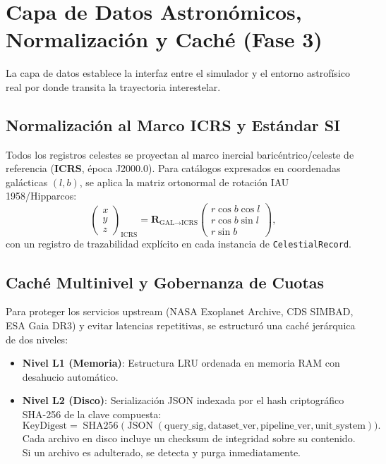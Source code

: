 \documentclass[11pt,a4paper]{article}
\begin{document}
\section{Capa de Datos Astronómicos, Normalización y Caché (Fase 3)}

La capa de datos establece la interfaz entre el simulador y el entorno astrofísico real por donde transita la trayectoria interestelar.

\subsection{Normalización al Marco ICRS y Estándar SI}
Todos los registros celestes se proyectan al marco inercial baricéntrico/celeste de referencia (\textbf{ICRS}, época J2000.0). Para catálogos expresados en coordenadas galácticas $(l, b)$, se aplica la matriz ortonormal de rotación IAU 1958/Hipparcos:
\begin{equation}
    \begin{pmatrix} x \\ y \\ z \end{pmatrix}_{\text{ICRS}} = \mathbf{R}_{\text{GAL}\to\text{ICRS}} \begin{pmatrix} r \cos b \cos l \\ r \cos b \sin l \\ r \sin b \end{pmatrix},
\end{equation}
con un registro de trazabilidad explícito en cada instancia de \texttt{CelestialRecord}.

\subsection{Caché Multinivel y Gobernanza de Cuotas}
Para proteger los servicios upstream (NASA Exoplanet Archive, CDS SIMBAD, ESA Gaia DR3) y evitar latencias repetitivas, se estructuró una caché jerárquica de dos niveles:
\begin{itemize}
    \item \textbf{Nivel L1 (Memoria)}: Estructura LRU ordenada en memoria RAM con desahucio automático.
    \item \textbf{Nivel L2 (Disco)}: Serialización JSON indexada por el hash criptográfico SHA-256 de la clave compuesta:
    \begin{equation}
        \text{KeyDigest} = \operatorname{SHA256}\Big(\operatorname{JSON}\left(\text{query\_sig}, \text{dataset\_ver}, \text{pipeline\_ver}, \text{unit\_system}\right)\Big).
    \end{equation}
    Cada archivo en disco incluye un checksum de integridad sobre su contenido. Si un archivo es adulterado, se detecta y purga inmediatamente.
\end{itemize}
\end{document}
